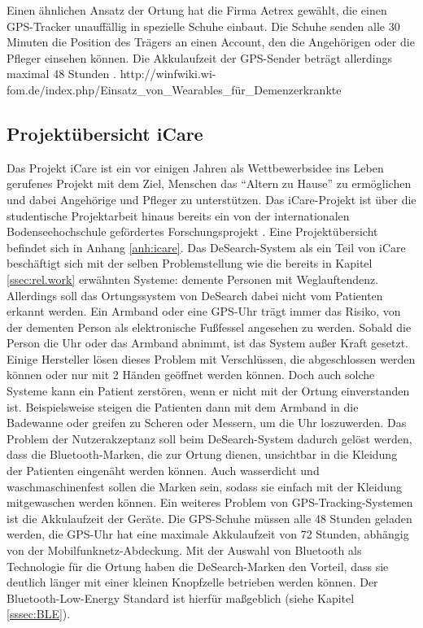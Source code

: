 Einen ähnlichen Ansatz der Ortung hat die Firma Aetrex gewählt, die einen GPS-Tracker unauffällig in spezielle Schuhe einbaut. Die Schuhe senden alle 30 Minuten die Position des Trägers an einen Account, den die Angehörigen oder die Pfleger einsehen können. Die Akkulaufzeit der GPS-Sender beträgt allerdings maximal 48 Stunden \citep[Vgl.][]{aetrex}.
http://winfwiki.wi-fom.de/index.php/Einsatz\_von\_Wearables\_für\_Demenzerkrankte\\



\subsection{Projektübersicht iCare}
Das Projekt iCare ist ein vor einigen Jahren als Wettbewerbsidee ins Leben gerufenes Projekt mit dem Ziel, Menschen das \enquote{Altern zu Hause} zu ermöglichen und dabei Angehörige und Pfleger zu unterstützen.  Das iCare-Projekt ist über die studentische Projektarbeit hinaus bereits ein von der internationalen Bodenseehochschule gefördertes Forschungsprojekt \citep[Vgl.][]{icare-dhbw}. Eine Projektübersicht befindet sich in Anhang \ref{anh:icare}.
Das DeSearch-System als ein Teil von iCare beschäftigt sich mit der selben Problemstellung wie die bereits in Kapitel \ref{ssec:rel.work} erwähnten Systeme: demente Personen mit Weglauftendenz. Allerdings soll das Ortungssystem von DeSearch dabei nicht vom Patienten erkannt werden. Ein Armband oder eine GPS-Uhr trägt immer das Risiko, von der dementen Person als elektronische Fußfessel angesehen zu werden. Sobald die Person die Uhr oder das Armband abnimmt, ist das System außer Kraft gesetzt. Einige Hersteller lösen dieses Problem mit Verschlüssen, die abgeschlossen werden können oder nur mit 2 Händen geöffnet werden können. Doch auch solche Systeme kann ein Patient zerstören, wenn er nicht mit der Ortung einverstanden ist. Beispielsweise steigen die Patienten dann mit dem Armband in die Badewanne oder greifen zu Scheren oder Messern, um die Uhr loszuwerden. Das Problem der Nutzerakzeptanz soll beim DeSearch-System dadurch gelöst werden, dass die Bluetooth-Marken, die zur Ortung dienen, unsichtbar in die Kleidung der Patienten eingenäht werden können. Auch wasserdicht und waschmaschinenfest sollen die Marken sein, sodass sie einfach mit der Kleidung mitgewaschen werden können. Ein weiteres Problem von GPS-Tracking-Systemen ist die Akkulaufzeit der Geräte. Die GPS-Schuhe müssen alle 48 Stunden geladen werden, die GPS-Uhr hat eine maximale Akkulaufzeit von 72 Stunden, abhängig von der Mobilfunknetz-Abdeckung. Mit der Auswahl von Bluetooth als Technologie für die Ortung haben die DeSearch-Marken den Vorteil, dass sie deutlich länger mit einer kleinen Knopfzelle betrieben werden können. Der Bluetooth-Low-Energy Standard ist hierfür maßgeblich (siehe Kapitel \ref{sssec:BLE}).

